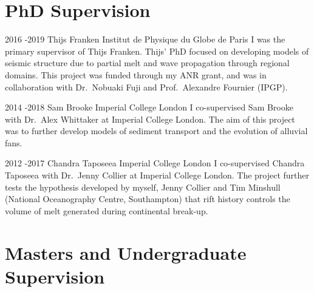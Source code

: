 
\section{PhD Supervision}

\job
{2016 -}{2019}
{Thijs Franken}
{}
{Institut de Physique du Globe de Paris}
{I was the primary supervisor of Thijs Franken. Thijs' PhD focused on developing models of seismic structure due to partial melt and wave propagation through regional domains.  This project was funded through my ANR grant, and was in collaboration with Dr.~Nobuaki Fuji and Prof.~Alexandre Fournier (IPGP).}

\job
{2014 -}{2018}
{Sam Brooke}
{}
{Imperial College London}
{I co-supervised Sam Brooke with Dr.~Alex Whittaker at Imperial College London. The aim of this project was to further develop models of sediment transport and the evolution of alluvial fans.}

\job
{2012 -}{2017}
{Chandra Taposeea}
{}
{Imperial College London}
{I co-supervised Chandra Taposeea with Dr.~Jenny Collier at Imperial College London. The project further tests the hypothesis developed by myself, Jenny Collier and Tim Minshull (National Oceanography Centre, Southampton) that rift history controls the volume of melt generated during continental break-up.}

\section{Masters and Undergraduate Supervision}


